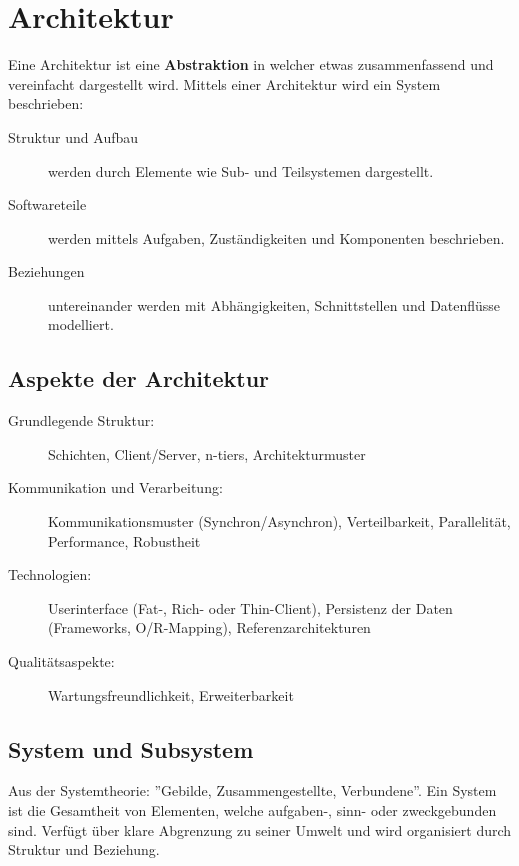 \section{Architektur}
Eine Architektur ist eine \textbf{Abstraktion} in welcher etwas zusammenfassend und vereinfacht dargestellt wird. Mittels einer Architektur wird ein System beschrieben:

\begin{description}
	\item[Struktur und Aufbau] werden durch Elemente wie Sub- und Teilsystemen dargestellt.
	\item[Softwareteile] werden mittels Aufgaben, Zuständigkeiten und Komponenten beschrieben.
	\item [Beziehungen] untereinander werden mit Abhängigkeiten, Schnittstellen und Datenflüsse modelliert.
\end{description}

\subsection{Aspekte der Architektur}
\begin{description}
	\item[Grundlegende Struktur:] Schichten, Client/Server, n-tiers, Architekturmuster
	\item[Kommunikation und Verarbeitung:] Kommunikationsmuster (Synchron/Asynchron), Verteilbarkeit, Parallelität, Performance, Robustheit
	\item[Technologien:] Userinterface (Fat-, Rich- oder Thin-Client), Persistenz der Daten (Frameworks, O/R-Mapping), Referenzarchitekturen
	\item[Qualitätsaspekte:] Wartungsfreundlichkeit, Erweiterbarkeit
\end{description}

\subsection{System und Subsystem}
Aus der Systemtheorie: ''Gebilde, Zusammengestellte, Verbundene''. Ein System ist die Gesamtheit von Elementen, welche aufgaben-, sinn- oder zweckgebunden sind. Verfügt über klare Abgrenzung zu seiner Umwelt und wird organisiert durch Struktur und Beziehung.

